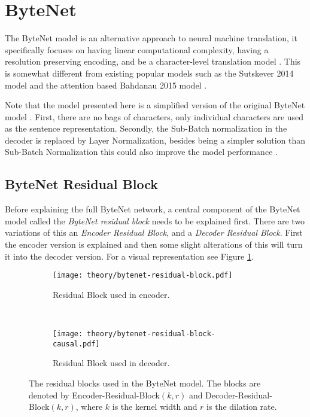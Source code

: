 \section{ByteNet}
\label{sec:theory:bytenet}

The ByteNet model is an alternative approach to neural machine translation, it specifically focuses on having linear computational complexity, having a resolution preserving encoding, and be a character-level translation model \cite{bytenet}. This is somewhat different from existing popular models such as the Sutskever 2014 model \cite{sutskever-2014-nmt} and the attention based Bahdanau 2015 model \cite{bahdanau-2015-nmt}.

Note that the model presented here is a simplified version of the original ByteNet model \cite{bytenet}. First, there are no bags of characters, only individual characters are used as the sentence representation. Secondly, the Sub-Batch normalization in the decoder is replaced by Layer Normalization, besides being a simpler solution than Sub-Batch Normalization this could also improve the model performance \cite{layer-normalization}.

\subsection{ByteNet Residual Block}

Before explaining the full ByteNet network, a central component of the ByteNet model called the \textit{ByteNet residual block} needs to be explained first. There are two variations of this an \textit{Encoder Residual Block}, and a \textit{Decoder Residual Block}. First the encoder version is explained and then some slight alterations of this will turn it into the decoder version. For a visual representation see Figure \ref{fig:bytenet:residual-block}.

\begin{figure}[h]
    \centering
    \begin{subfigure}[b]{0.45\textwidth}
        \centering
        \texttt{[image: theory/bytenet-residual-block.pdf]}
        \caption{Residual Block used in encoder.}
    \end{subfigure}
    ~ %
    \begin{subfigure}[b]{0.45\textwidth}
        \centering
        \texttt{[image: theory/bytenet-residual-block-causal.pdf]}
        \caption{Residual Block used in decoder.}
    \end{subfigure}
    \caption{The residual blocks used in the ByteNet model. The blocks are denoted by Encoder-Residual-Block$(k,r)$ and Decoder-Residual-Block$(k,r)$, where $k$ is the kernel width and $r$ is the dilation rate.}
    \label{fig:bytenet:residual-block}
\end{figure}

